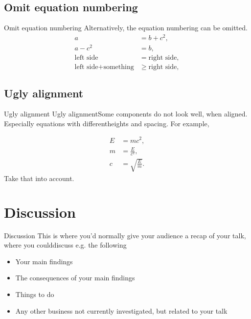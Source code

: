 \documentclass[aspectratio=169]{beamer}
\begin{document}
\subsection{Omit equation numbering}

\begin{frame}{Omit equation numbering}
Alternatively, the equation numbering can be omitted.
\begin{align*} 
a &= b + c^2, \\ 
a - c^2 &= b, \\
\text{left side} &= \text{right side},\\
\text{left side} + \text{something} &\ge \text{right side},    
\end{align*}

\end{frame}

\subsection{Ugly alignment}

\begin{frame}{Ugly alignment}
Ugly alignmentSome components do not look well, when aligned.  Especially equations with differentheights and spacing.  For example,
\begin{center}
 \begin{align} 
E &= mc^2, \\ 
m &= \frac{E}{c^2}, \\
c &= \sqrt{\frac{E}{m}}.
\end{align}
Take that into account.
\end{center}
\end{frame}


\section{Discussion}
\begin{frame}{Discussion}
This is where you’d normally give your audience a recap of your talk, where you coulddiscuss e.g.  the following
 \begin{itemize}
\item Your main findings
\item The consequences of your main findings
\item Things to do
\item Any other business not currently investigated, but related to your talk
\end{itemize}

\end{frame}
\end{document}
